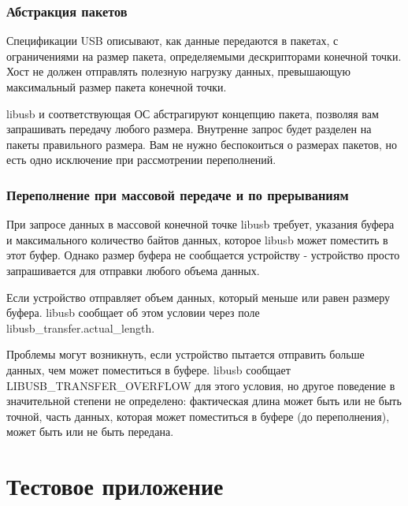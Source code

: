 \documentclass[14pt,a4paper]{article}
\begin{document}
\subsubsection{Абстракция пакетов}
\par Спецификации USB описывают, как данные передаются в пакетах, с ограничениями на размер пакета, определяемыми дескрипторами конечной точки. Хост не должен отправлять полезную нагрузку данных, превышающую максимальный размер пакета конечной точки.\\

\par libusb и соответствующая ОС абстрагируют концепцию пакета, позволяя вам запрашивать передачу любого размера. Внутренне запрос будет разделен на пакеты правильного размера. Вам не нужно беспокоиться о размерах пакетов, но есть одно исключение при рассмотрении переполнений.\\

\subsubsection{Переполнение при массовой передаче и по прерываниям}
При запросе данных в массовой конечной точке libusb требует, указания буфера и максимального количество байтов данных, которое libusb может поместить в этот буфер. Однако размер буфера не сообщается устройству - устройство просто запрашивается для отправки любого объема данных.\\

\par Если устройство отправляет объем данных, который меньше или равен размеру буфера. libusb сообщает об этом условии через поле libusb\_transfer.actual\_length.\\

\par Проблемы могут возникнуть, если устройство пытается отправить больше данных, чем может поместиться в буфере. libusb сообщает LIBUSB\_TRANSFER\_OVERFLOW для этого условия, но другое поведение в значительной степени не определено: фактическая длина может быть или не быть точной, часть данных, которая может поместиться в буфере (до переполнения), может быть или не быть передана.\\



\section{Тестовое приложение}
\end{document}
